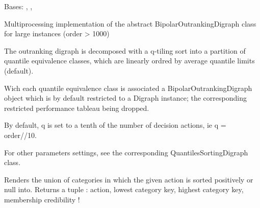 \documentclass[letterpaper,10pt,english]{sphinxmanual}
\begin{document}

\begin{fulllineitems}
\label{techDoc:bigOutrankingDigraphs.BigOutrankingDigraphMP}
Bases: {\hyperref[techDoc:bigOutrankingDigraphs.BigOutrankingDigraph]{\emph{}}}, {\hyperref[techDoc:weakOrders.QuantilesRankingDigraph]{\emph{}}}, {\hyperref[techDoc:perfTabs.PerformanceTableau]{\emph{}}}

Multiprocessing implementation of the abstract BipolarOutrankingDigraph class
for large instances (order \textgreater{} 1000)

The outranking digraph is decomposed with a q-tiling sort into a partition of
quantile equivalence classes, which are linearly ordred by average quantile limits (default).

Wich each quantile equivalence class is associated a BipolarOutrankingDigraph object
which is by default restricted to a Digraph instance;
the corresponding restricted performance tableau being dropped.

By default, q is set to a tenth of the number of decision actions,
ie q = order//10.

For other parameters settings, see the corresponding QuantilesSortingDigraph class.

\begin{fulllineitems}
\label{techDoc:bigOutrankingDigraphs.BigOutrankingDigraphMP.computeActionCategories}
Renders the union of categories in which the given action is sorted positively or null into.
Returns a tuple : action, lowest category key, highest category key, membership credibility !

\end{fulllineitems}


\end{fulllineitems}
\end{document}
